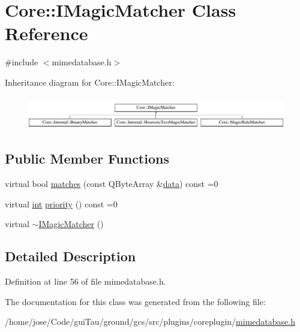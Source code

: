 \hypertarget{class_core_1_1_i_magic_matcher}{\section{Core\-:\-:I\-Magic\-Matcher Class Reference}
\label{class_core_1_1_i_magic_matcher}
}


{\ttfamily \#include $<$mimedatabase.\-h$>$}

Inheritance diagram for Core\-:\-:I\-Magic\-Matcher\-:\begin{figure}[H]
\begin{center}
\leavevmode
\includegraphics[height=1.452659cm]{class_core_1_1_i_magic_matcher}
\end{center}
\end{figure}
\subsection*{Public Member Functions}
\begin{DoxyCompactItemize}
\item 
virtual bool \hyperlink{group___core_plugin_ga2571173c2abeb821f275fc5ff669b37a}{matches} (const Q\-Byte\-Array \&\hyperlink{glext_8h_a8850df0785e6fbcc2351af3b686b8c7a}{data}) const =0
\item 
virtual \hyperlink{ioapi_8h_a787fa3cf048117ba7123753c1e74fcd6}{int} \hyperlink{group___core_plugin_ga01c0bbe130ce9e9ed58f3c359a1b81ff}{priority} () const =0
\item 
virtual \hyperlink{group___core_plugin_ga70c3fb739222b588d80c8e770a4d33b3}{$\sim$\-I\-Magic\-Matcher} ()
\end{DoxyCompactItemize}


\subsection{Detailed Description}


Definition at line 56 of file mimedatabase.\-h.



The documentation for this class was generated from the following file\-:\begin{DoxyCompactItemize}
\item 
/home/jose/\-Code/gui\-Tau/ground/gcs/src/plugins/coreplugin/\hyperlink{mimedatabase_8h}{mimedatabase.\-h}\end{DoxyCompactItemize}
